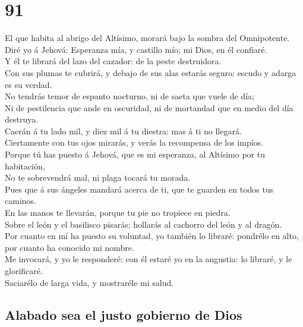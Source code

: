 \hypertarget{section-90}{%
\section{91}\label{section-90}}

 El que habita al abrigo del Altísimo, morará bajo la sombra
del Omnipotente.\\
 Diré yo á Jehová: Esperanza mía, y castillo mío; mi Dios,
en él confiaré.\\
 Y él te librará del lazo del cazador: de la peste
destruidora.\\
 Con sus plumas te cubrirá, y debajo de sus alas estarás
seguro: escudo y adarga es su verdad.\\
 No tendrás temor de espanto nocturno, ni de saeta que vuele
de día;\\
 Ni de pestilencia que ande en oscuridad, ni de mortandad
que en medio del día destruya.\\
 Caerán á tu lado mil, y diez mil á tu diestra: mas á ti no
llegará.\\
 Ciertamente con tus ojos mirarás, y verás la recompensa de
los impíos.\\
 Porque tú has puesto á Jehová, que es mi esperanza, al
Altísimo por tu habitación,\\
 No te sobrevendrá mal, ni plaga tocará tu morada.\\
 Pues que á sus ángeles mandará acerca de ti, que te
guarden en todos tus caminos.\\
 En las manos te llevarán, porque tu pie no tropiece en
piedra.\\
 Sobre el león y el basilisco pisarás; hollarás al cachorro
del león y al dragón.\\
 Por cuanto en mí ha puesto su voluntad, yo también lo
libraré: pondrélo en alto, por cuanto ha conocido mi nombre.\\
 Me invocará, y yo le responderé: con él estaré yo en la
angustia: lo libraré, y le glorificaré.\\
 Saciarélo de larga vida, y mostraréle mi salud.

\hypertarget{alabado-sea-el-justo-gobierno-de-dios}{%
\subsection{Alabado sea el justo gobierno de
Dios}\label{alabado-sea-el-justo-gobierno-de-dios}}

